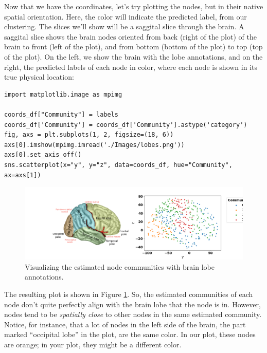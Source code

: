 Now that we have the coordinates, let's try plotting the nodes, but in their native spatial orientation. Here, the color will indicate the predicted label, from our clustering. The slices we'll show will be a saggital slice through the brain. A saggital slice shows the brain nodes oriented from back (right of the plot) of the brain to front (left of the plot), and from bottom (bottom of the plot) to top (top of the plot). On the left, we show the brain with the lobe annotations, and on the right, the predicted labels of each node in color, where each node is shown in its true physical location:

\begin{lstlisting}[style=python]
import matplotlib.image as mpimg

coords_df["Community"] = labels
coords_df['Community'] = coords_df['Community'].astype('category')
fig, axs = plt.subplots(1, 2, figsize=(18, 6))
axs[0].imshow(mpimg.imread('./Images/lobes.png'))
axs[0].set_axis_off()
sns.scatterplot(x="y", y="z", data=coords_df, hue="Community", ax=axs[1])
\end{lstlisting}
\begin{figure}[h]
    \centering
    \includegraphics[width=\linewidth]{foundations/ch2/Images/brain_preds.png}
    \caption[Visualizing estimated node communities in 3D space]{Visualizing the estimated node communities with brain lobe annotations.}
    \label{fig:ch2:brain_preds}
\end{figure}

The resulting plot is shown in Figure \ref{fig:ch2:brain_preds}. So, the estimated communities of each node don't quite perfectly align with the brain lobe that the node is in. However, nodes tend to be \emph{spatially close} to other nodes in the same estimated community. Notice, for instance, that a lot of nodes in the left side of the brain, the part marked ``occipital lobe'' in the plot, are the same color. In our plot, these nodes are orange; in your plot, they might be a different color. 


